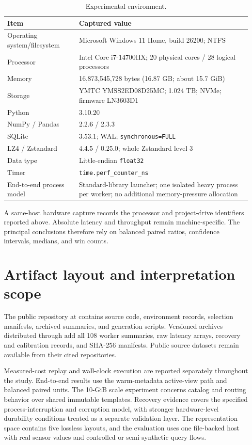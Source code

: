 \documentclass[preprint,12pt,authoryear]{elsarticle}
\begin{document}
\begin{table}[H]
\centering
\caption{Experimental environment.}
\begin{tabularx}{\textwidth}{@{}lX@{}}
\toprule
Item & Captured value \\
\midrule
Operating system/filesystem & Microsoft Windows 11 Home, build 26200; NTFS \\
Processor & Intel Core i7-14700HX; 20 physical cores / 28 logical processors \\
Memory & 16,873,545,728 bytes (16.87 GB; about 15.7 GiB) \\
Storage & YMTC YMSS2ED08D25MC; 1.024 TB; NVMe; firmware LN3603D1 \\
Python & 3.10.20 \\
NumPy / Pandas & 2.2.6 / 2.3.3 \\
SQLite & 3.53.1; WAL; \texttt{synchronous=FULL} \\
LZ4 / Zstandard & 4.4.5 / 0.25.0; whole Zstandard level 3 \\
Data type & Little-endian \texttt{float32} \\
Timer & \texttt{time.perf\_counter\_ns} \\
End-to-end process model & Standard-library launcher; one isolated heavy process per worker; no additional memory-pressure allocation \\
\bottomrule
\end{tabularx}
\end{table}

A same-host hardware capture records the processor and project-drive identifiers reported above. Absolute latency and throughput remain machine-specific. The principal conclusions therefore rely on balanced paired ratios, confidence intervals, medians, and win counts.

\section{Artifact layout and interpretation scope}

The public repository at \href{\ArtifactRepositoryURL}{\ArtifactRepositoryURLText} contains source code, environment records, selection manifests, archived summaries, and generation scripts. Versioned archives distributed through \href{\ArtifactReleaseURL}{\ArtifactReleaseURLText} add all 108 worker summaries, raw latency arrays, recovery and calibration records, and SHA-256 manifests. Public source datasets remain available from their cited repositories.

Measured-cost replay and wall-clock execution are reported separately throughout the study. End-to-end results use the warm-metadata active-view path and balanced paired units. The 10-GiB scale experiment concerns catalog and routing behavior over shared immutable templates. Recovery evidence covers the specified process-interruption and corruption model, with stronger hardware-level durability conditions treated as a separate validation layer. The representation space contains five lossless layouts, and the evaluation uses one file-backed host with real sensor values and controlled or semi-synthetic query flows.
\end{document}
